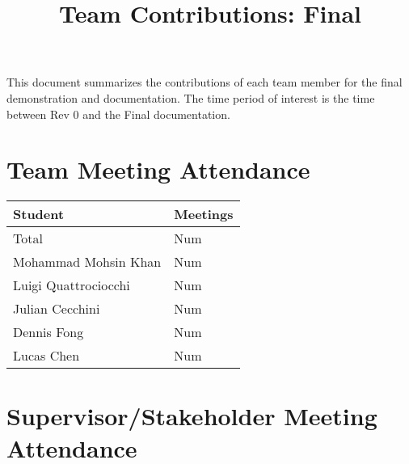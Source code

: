\documentclass{article}
\title{Team Contributions: Final\\\progname}
\author{\authname}
\date{}
\begin{document}
\maketitle

This document summarizes the contributions of each team member for the final
demonstration and documentation.  The time period of interest is the time
between Rev 0 and the Final documentation.

\section{Team Meeting Attendance}


\begin{table}[H]
\centering
\begin{tabular}{ll}
\toprule
\textbf{Student} & \textbf{Meetings}\\
\midrule
Total & Num\\
Mohammad Mohsin Khan & Num\\
Luigi Quattrociocchi & Num\\
Julian Cecchini & Num\\
Dennis Fong & Num\\
Lucas Chen & Num\\
\bottomrule
\end{tabular}
\end{table}


\section{Supervisor/Stakeholder Meeting Attendance}

\end{document}
